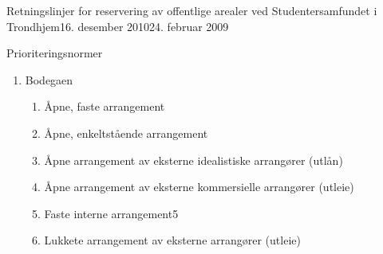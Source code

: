 \begin{instruks}{Retningslinjer for reservering av offentlige arealer
    ved Studentersamfundet i Trondhjem}{16. desember 2010}{24. februar 2009}
\begin{instruksledd}{Prioriteringsnormer}
\begin{enumerate}
\begin{enumerate}
                        \begin{enumerate}
                            \item Åpne, faste arrangementer/Studentersamfundets
                                Symfoniorchester
                            \item Fotballkamper på landskampnivå
                            \item Konserter
                            \item Andre åpne, enkeltstående arrangement
                            \item SIT-forestilling med tre generalprøvedager
                            \item Åpne arrangementer av Samfundets kunstneriske
                                gjenger
                            \item Andre øvinger
                            \item Åpne arrangementer av eksterne idealistiske
                                arrangører (utlån)
                            \item Faste interne arrangement4
                            \item Åpne arrangementer av eksterne kommersielle
                                arrangører (utleie)
                            \item Lukkete arrangement av eksterne arrangører
                                (utleie)
                            \item Interne fester
                        \end{enumerate}
                        4 For eksempel Samfundets Interne Grand Prix
                    \item Bodegaen
                        \begin{enumerate}
                            \item Åpne, faste arrangement
                            \item Åpne, enkeltstående arrangement
                            \item Åpne arrangement av eksterne idealistiske
                                arrangører (utlån)
                            \item Åpne arrangement av eksterne kommersielle
                                arrangører (utleie)
                            \item Faste interne arrangement5
                            \item Lukkete arrangement av eksterne arrangører (utleie)

\end{enumerate}
\end{enumerate}
\end{enumerate}
\end{instruksledd}
\end{instruks}
